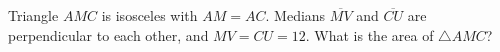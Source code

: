 Triangle $AMC$ is isosceles with $AM=AC$. Medians $\overline{MV}$ and $\overline{CU}$ are perpendicular to each other, and $MV=CU=12$. What is the area of $\triangle AMC$?
